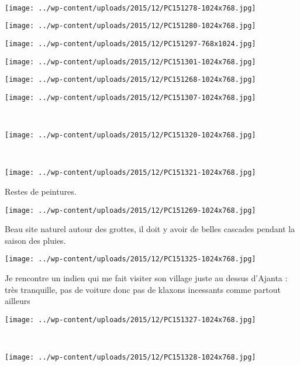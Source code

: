 ~\\
\begin{center} \texttt{[image: ../wp-content/uploads/2015/12/PC151278-1024x768.jpg]} \end{center}
\begin{center} \texttt{[image: ../wp-content/uploads/2015/12/PC151280-1024x768.jpg]} \end{center}
\begin{center} \texttt{[image: ../wp-content/uploads/2015/12/PC151297-768x1024.jpg]} \end{center}
\begin{center} \texttt{[image: ../wp-content/uploads/2015/12/PC151301-1024x768.jpg]} \end{center}
\begin{center} \texttt{[image: ../wp-content/uploads/2015/12/PC151268-1024x768.jpg]} \end{center}
\vfill
\begin{center} \texttt{[image: ../wp-content/uploads/2015/12/PC151307-1024x768.jpg]} \end{center}
\vspace{-\topsep}
\vspace{-0.75mm}
\pagebreak
~
\begin{center} \texttt{[image: ../wp-content/uploads/2015/12/PC151320-1024x768.jpg]} \end{center}
~\\
\begin{center} \texttt{[image: ../wp-content/uploads/2015/12/PC151321-1024x768.jpg]} \end{center}
\vspace{-\topsep}
\pagebreak

Restes de peintures.
\begin{center} \texttt{[image: ../wp-content/uploads/2015/12/PC151269-1024x768.jpg]} \end{center}

Beau site naturel autour des grottes, il doit y avoir de belles cascades pendant la saison des pluies. 
\begin{center} \texttt{[image: ../wp-content/uploads/2015/12/PC151325-1024x768.jpg]} \end{center}
\vspace{-\topsep}
\pagebreak

Je rencontre un indien qui me fait visiter son village juste au dessus d'Ajanta : très tranquille, pas de voiture donc pas de klaxons incessants comme partout ailleurs 
\begin{center} \texttt{[image: ../wp-content/uploads/2015/12/PC151327-1024x768.jpg]} \end{center}
~
\begin{center} \texttt{[image: ../wp-content/uploads/2015/12/PC151328-1024x768.jpg]} \end{center}
\vspace{-\topsep}
\pagebreak


